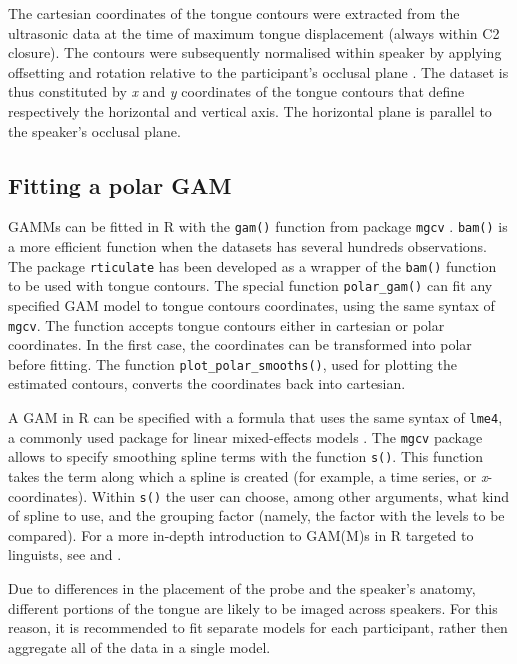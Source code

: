 \documentclass[12pt,]{article}
\begin{document}
The cartesian coordinates of the tongue contours were extracted from the
ultrasonic data at the time of maximum tongue displacement (always
within C2 closure). The contours were subsequently normalised within
speaker by applying offsetting and rotation relative to the
participant's occlusal plane \citep{scobbie2011}. The dataset is thus
constituted by \emph{x} and \emph{y} coordinates of the tongue contours
that define respectively the horizontal and vertical axis. The
horizontal plane is parallel to the speaker's occlusal plane.

\hypertarget{fitting-a-polar-gam}{%
\subsection{Fitting a polar GAM}\label{fitting-a-polar-gam}}

GAMMs can be fitted in R with the \texttt{gam()} function from package
\texttt{mgcv} \citep{wood2011, wood2017}. \texttt{bam()} is a more
efficient function when the datasets has several hundreds observations.
The package \texttt{rticulate} has been developed as a wrapper of the
\texttt{bam()} function to be used with tongue contours. The special
function \texttt{polar\_gam()} can fit any specified GAM model to tongue
contours coordinates, using the same syntax of \texttt{mgcv}. The
function accepts tongue contours either in cartesian or polar
coordinates. In the first case, the coordinates can be transformed into
polar before fitting. The function \texttt{plot\_polar\_smooths()}, used
for plotting the estimated contours, converts the coordinates back into
cartesian.

A GAM in R can be specified with a formula that uses the same syntax of
\texttt{lme4}, a commonly used package for linear mixed-effects models
\citep{bates2015}. The \texttt{mgcv} package allows to specify smoothing
spline terms with the function \texttt{s()}. This function takes the
term along which a spline is created (for example, a time series, or
\emph{x}-coordinates). Within \texttt{s()} the user can choose, among
other arguments, what kind of spline to use, and the grouping factor
(namely, the factor with the levels to be compared). For a more in-depth
introduction to GAM(M)s in R targeted to linguists, see
\citet{soskuthy2017} and \citet{wieling2017}.

Due to differences in the placement of the probe and the speaker's
anatomy, different portions of the tongue are likely to be imaged across
speakers. For this reason, it is recommended to fit separate models for
each participant, rather then aggregate all of the data in a single
model.
\end{document}
